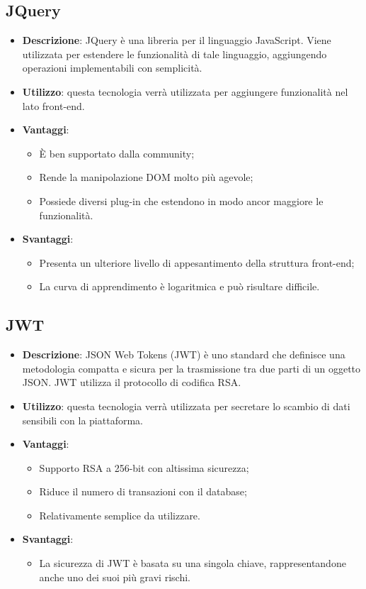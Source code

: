 \subsection{JQuery}
\begin{itemize}
	\item \textbf{Descrizione}: JQuery è una libreria per il linguaggio JavaScript. Viene utilizzata per estendere le funzionalità di tale linguaggio, aggiungendo operazioni implementabili con semplicità.
	\item \textbf{Utilizzo}: questa tecnologia verrà utilizzata per aggiungere funzionalità nel lato front-end.
	\item \textbf{Vantaggi}:
	\begin{itemize}
		\item \MakeUppercase{è} ben supportato dalla community;
		\item Rende la manipolazione DOM molto più agevole;
		\item Possiede diversi plug-in che estendono in modo ancor maggiore le funzionalità.
	\end{itemize}
	\item \textbf{Svantaggi}:
	\begin{itemize}
		\item Presenta un ulteriore livello di appesantimento della struttura front-end;
		\item La curva di apprendimento è logaritmica e può risultare difficile.
	\end{itemize}
\end{itemize}

\subsection{JWT}
\begin{itemize}
	\item \textbf{Descrizione}: JSON Web Tokens (JWT) è uno standard che definisce una metodologia compatta e sicura per la trasmissione tra due parti di un oggetto JSON. JWT utilizza il protocollo di codifica RSA.
	\item \textbf{Utilizzo}: questa tecnologia verrà utilizzata per secretare lo scambio di dati sensibili con la piattaforma.
	\item \textbf{Vantaggi}:
	\begin{itemize}
		\item Supporto RSA a 256-bit con altissima sicurezza;
		\item Riduce il numero di transazioni con il database;
		\item Relativamente semplice da utilizzare.
	\end{itemize}
	\item \textbf{Svantaggi}:
	\begin{itemize}
		\item La sicurezza di JWT è basata su una singola chiave, rappresentandone anche uno dei suoi più gravi rischi.
	\end{itemize}
\end{itemize}


